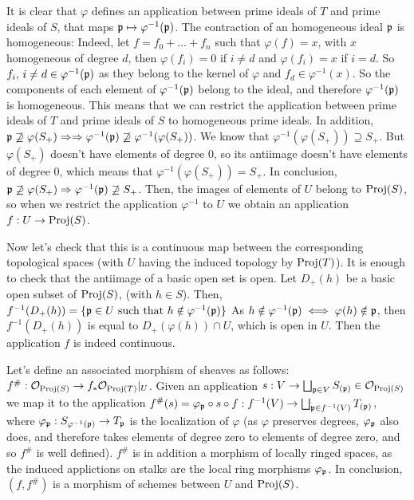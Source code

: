 \begin{sol}
\begin{enumerate}[label=\alph*)]
		It is clear that $\varphi$ defines an application between prime ideals of $T$ and prime ideals of $S$, that maps $\mathfrak{p} \mapsto \varphi^{-1}(\mathfrak{p})$. The contraction of an homogeneous ideal $\mathfrak{p}$ is homogeneous: Indeed, let $f = f_0 + \dots + f_n$ such that $\varphi(f) = x$, with $x$ homogeneous of degree $d$, then $\varphi(f_i) = 0$ if $i \neq d$ and $\varphi(f_i) = x$ if $i = d$. So $f_i, \, i \neq d \in \varphi^{-1}(\mathfrak{p})$ as they belong to the kernel of $\varphi$ and $f_d \in \varphi^{-1}(x)$. So the components of each element of $\varphi^{-1}(\mathfrak{p})$ belong to the ideal, and therefore $\varphi^{-1}(\mathfrak{p})$ is homogeneous. This means that we can restrict the application between prime ideals of $T$ and prime ideals of $S$ to homogeneous prime ideals. In addition, $\mathfrak{p} \not\supseteq \varphi(S_+) \Rightarrow \Rightarrow \varphi^{-1}(\mathfrak{p}) \not\supseteq \varphi^{-1}(\varphi(S_+))$. We know that $\varphi^{-1}(\varphi(S_+)) \supseteq S_+$. But $\varphi(S_+)$ doesn't have elements of degree $0$, so its antiimage doesn't have elements of degree $0$, which means that $\varphi^{-1}(\varphi(S_+)) = S_+$. In conclusion, $\mathfrak{p} \not\supseteq \varphi(S_+) \Rightarrow \varphi^{-1}(\mathfrak{p}) \not\supseteq S_+$. Then, the images of elements of $U$ belong to $\mathrm{Proj}(S)$, so when we restrict the application $\varphi^{-1}$ to $U$ we obtain an application $f: U \to \mathrm{Proj}(S)$.

		Now let's check that this is a continuous map between the corresponding topological spaces (with $U$ having the induced topology by $\mathrm{Proj}(T)$). It is enough to check that the antiimage of a basic open set is open. Let $D_+(h)$ be a basic open subset of $\mathrm{Proj}(S)$, (with $h \in S$). Then, $f^{-1}(D_+(h)) = \{\mathfrak{p} \in U \text{ such that } h \notin \varphi^{-1}(\mathfrak{p}) \}$ As $h \notin \varphi^{-1}(\mathfrak{p}) \iff \varphi(h) \notin \mathfrak{p}$, then $f^{-1}(D_+(h))$ is equal to $D_+(\varphi(h)) \cap U$, which is open in $U$. Then the application $f$ is indeed continuous.

		Let's define an associated morphism of sheaves as follows: $f^{\#}: \mathcal{O}_{\mathrm{Proj}(S)} \to f_*\mathcal{O}_{\mathrm{Proj}(T)}|_U$. Given an application $s: V \to \bigsqcup_{\mathfrak{p} \in V} S_{(\mathfrak{p})} \in \mathcal{O}_{\mathrm{Proj}(S)}$ we map it to the application $f^{\#}(s) = \varphi_{\mathfrak{p}} \circ s \circ f: f^{-1}(V) \to \bigsqcup_{\mathfrak{p} \in f^{-1}(V)} T_{(\mathfrak{p})}$, where $\varphi_{\mathfrak{p}}: S_{\varphi^{-1}(\mathfrak{p})} \to T_{\mathfrak{p}}$ is the localization of $\varphi$ (as $\varphi$ preserves degrees, $\varphi_{\mathfrak{p}}$ also does, and therefore takes elements of degree zero to elements of degree zero, and so $f^{\#}$ is well defined). $f^{\#}$ is in addition a morphism of locally ringed spaces, as the induced applictions on stalks are the local ring morphisms $\varphi_{\mathfrak{p}}$. In conclusion, $(f, f^{\#})$ is a morphism of schemes between $U$ and $\mathrm{Proj}(S)$.


\end{enumerate}
\end{sol}
